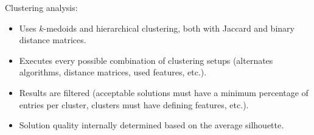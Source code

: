 \documentclass{beamer}
\begin{document}
\begin{frame}[allowframebreaks]
\framebreak

Clustering analysis:
\begin{itemize}
\item
Uses $k$-medoids and hierarchical clustering, both with Jaccard and binary
distance matrices.

\item
Executes every possible combination of clustering setups (alternates algorithms,
distance matrices, used features, etc.).

\item
Results are filtered (acceptable solutions must have a minimum percentage of
entries per cluster, clusters must have defining features, etc.).

\item
Solution quality internally determined based on the average silhouette.
\end{itemize}








\end{frame}
\end{document}
